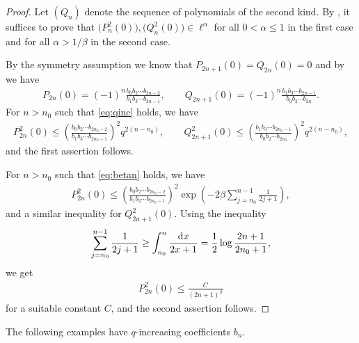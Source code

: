 \documentclass[pdftex]{sigma}
\numberwithin{equation}{section}
\begin{document}
\begin{proof} Let $(Q_n)$ denote the sequence of polynomials of the second kind. By \cite[Theorem~1.2]{B:S2}, it suffices to prove that $\big(P_n^2(0)\big), \big(Q_n^2(0)\big)\in\ell^\alpha$ for all $0<\alpha\le 1$ in the first case and for all $\alpha>1/\beta$ in the second case.

 By the symmetry assumption we know that $P_{2n+1}(0)=Q_{2n}(0)=0$ and by \cite[Remark 4.5]{B:S2} we have
\begin{gather}\label{eq:P2n(0)}
P_{2n}(0)=(-1)^n\frac{b_0b_2\cdots b_{2n-2}}{b_1b_3\cdots b_{2n-1}},\qquad Q_{2n+1}(0)=(-1)^n\frac{b_1b_3\cdots b_{2n-1}}{b_0b_2\cdots b_{2n}}.
\end{gather}
For $n>n_0$ such that \eqref{eq:qinc} holds, we have
\begin{gather*}
P_{2n}^2(0)\le \left(\frac{b_0b_2\cdots b_{2n_0-2}}{b_1b_3\cdots b_{2n_0-1}}\right)^2q^{2(n-n_0)},\qquad
Q_{2n+1}^2(0)\le \left(\frac{b_1b_3\cdots b_{2n_0-1}}{b_0b_2\cdots b_{2n_0}}\right)^2 q^{2(n-n_0)},
\end{gather*}
and the first assertion follows.

For $n>n_0$ such that \eqref{eq:betan} holds, we have
\begin{gather*}
P_{2n}^2(0)\le \left(\frac{b_0b_2\cdots b_{2n_0-2}}{b_1b_3\cdots b_{2n_0-1}}\right)^2\exp\left(-2\beta\sum_{j=n_0}^{n-1}\frac{1}{2j+1}\right),
\end{gather*}
and a similar inequality for $Q_{2n+1}^2(0)$. Using the inequality
\begin{gather*}
\sum_{j=n_0}^{n-1}\frac{1}{2j+1}\ge \int_{n_0}^n\frac{{\rm d}x}{2x+1}=\frac12\log\frac{2n+1}{2n_0+1},
\end{gather*}
we get
\begin{gather*}
P_{2n}^2(0)\le \frac{C}{(2n+1)^\beta}
\end{gather*}
for a suitable constant $C$, and the second assertion follows.
\end{proof}

The following examples have $q$-increasing coefficients $b_n$.
\end{document}
